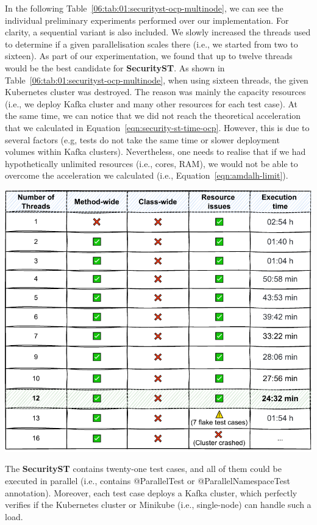 In the following Table~\ref{06:tab:01:securityst-ocp-multinode}, we can see the individual preliminary experiments performed over our implementation.
For clarity, a sequential variant is also included.
We slowly increased the threads used to determine if a given parallelisation scales there (i.e., we started from two to sixteen).
As part of our experimentation, we found that up to twelve threads would be the best candidate for \textbf{SecurityST}.
As shown in Table~\ref{06:tab:01:securityst-ocp-multinode}, when using sixteen threads, the given Kubernetes cluster was destroyed.
The reason was mainly the capacity resources (i.e., we deploy Kafka cluster and many other resources for each test case).
At the same time, we can notice that we did not reach the theoretical acceleration that we calculated in Equation~\eqref{eqn:security-st-time-ocp}.
However, this is due to several factors (e.g, tests do not take the same time or slower deployment volumes within Kafka clusters).
Nevertheless, one needs to realise that if we had hypothetically unlimited resources (i.e., cores, RAM), we would not be able to overcome
the acceleration we calculated (i.e., Equation~\eqref{eqn:amdalh-limit}).
\begin{table}[ht!]
    \centering
    \includegraphics[scale=0.8]{obrazky-figures/08-experiments/preliminary/06-exp-final-smoke-method-wide-ocp}
    \caption{The \textbf{SecurityST} contains twenty-one test cases, and all of them could be executed in parallel
        (i.e., contains @ParallelTest or @ParallelNamespaceTest annotation).
        Moreover, each test case deploys a Kafka cluster, which perfectly verifies if the Kubernetes cluster
        or Minikube (i.e., single-node) can handle such a load.}
    \label{06:tab:01:securityst-ocp-multinode}
\end{table}

